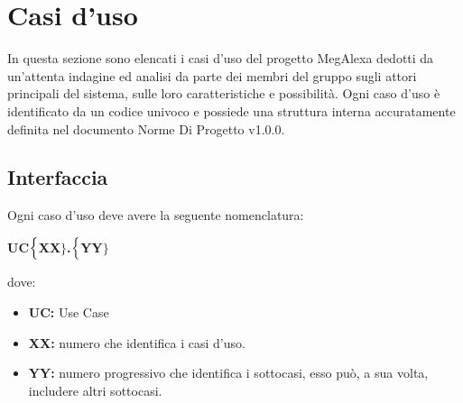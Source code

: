 \chapter{Casi d'uso}
In questa sezione sono elencati i casi d'uso del progetto MegAlexa dedotti da un'attenta indagine ed analisi da parte dei membri del gruppo sugli attori principali del sistema, sulle loro caratteristiche e possibilità.
Ogni caso d'uso è identificato da un codice univoco e possiede una struttura interna accuratamente definita nel documento Norme Di Progetto 
v1.0.0.


\section{Interfaccia}
Ogni caso d'uso deve avere la seguente nomenclatura:

\begin{center}
	\textbf{UC$\Bigl\{$XX$\Bigr\}$.$\Bigl\{$YY$\Bigr\}$}
\end{center}
dove:
\begin{itemize}
	\item \textbf{UC:} Use Case
	\item \textbf{{XX}:} numero che identifica i casi d'uso.
	\item \textbf{{YY}:} numero progressivo che identifica i sottocasi, esso può, a sua volta, includere altri sottocasi.
\end{itemize}


\noindent{}

